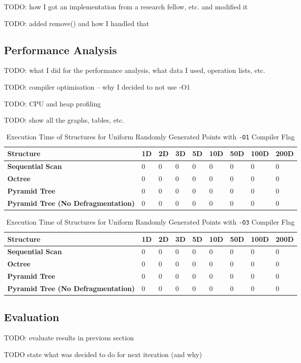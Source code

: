 TODO: how I got an implementation from a research fellow, etc. and modified it

TODO: added remove() and how I handled that

\subsection{Performance Analysis}

TODO: what I did for the performance analysis, what data I used, operation lists, etc.

TODO: compiler optimisation -- why I decided to not use -O1 

TODO: CPU and heap profiling

TODO: show all the graphs, tables, etc.

\begin{table}
	\centering
	\begin{tabular}{|l|l|l|l|l|l|l|l|l|}
		\hline
		\textbf{Structure} & \textbf{1D} & \textbf{2D} & \textbf{3D} & \textbf{5D} & \textbf{10D} & \textbf{50D} & \textbf{100D} & \textbf{200D} \\
		\hline
		\textbf{Sequential Scan} & 0 & 0 & 0 & 0 & 0 & 0 & 0 & 0 \\
		\textbf{Octree} & 0 & 0 & 0 & 0 & 0 & 0 & 0 & 0 \\
		\textbf{Pyramid Tree} & 0 & 0 & 0 & 0 & 0 & 0 & 0 & 0 \\
		\textbf{Pyramid Tree (No Defragmentation)} & 0 & 0 & 0 & 0 & 0 & 0 & 0 & 0 \\
		\hline
	\end{tabular}
	\caption{Execution Time of Structures for Uniform Randomly Generated Points with \texttt{-O1} Compiler Flag}
	\label{tab:perf1-randuniform-o1}
\end{table}

\begin{table}
	\centering
	\begin{tabular}{|l|l|l|l|l|l|l|l|l|}
		\hline
		\textbf{Structure} & \textbf{1D} & \textbf{2D} & \textbf{3D} & \textbf{5D} & \textbf{10D} & \textbf{50D} & \textbf{100D} & \textbf{200D} \\
		\hline
		\textbf{Sequential Scan} & 0 & 0 & 0 & 0 & 0 & 0 & 0 & 0 \\
		\textbf{Octree} & 0 & 0 & 0 & 0 & 0 & 0 & 0 & 0 \\
		\textbf{Pyramid Tree} & 0 & 0 & 0 & 0 & 0 & 0 & 0 & 0 \\
		\textbf{Pyramid Tree (No Defragmentation)} & 0 & 0 & 0 & 0 & 0 & 0 & 0 & 0 \\
		\hline
	\end{tabular}
	\caption{Execution Time of Structures for Uniform Randomly Generated Points with \texttt{-O3} Compiler Flag}
	\label{tab:perf1-randuniform-o3}
\end{table}

\subsection{Evaluation}

TODO: evaluate results in previous section

TODO state what was decided to do for next iteration (and why)